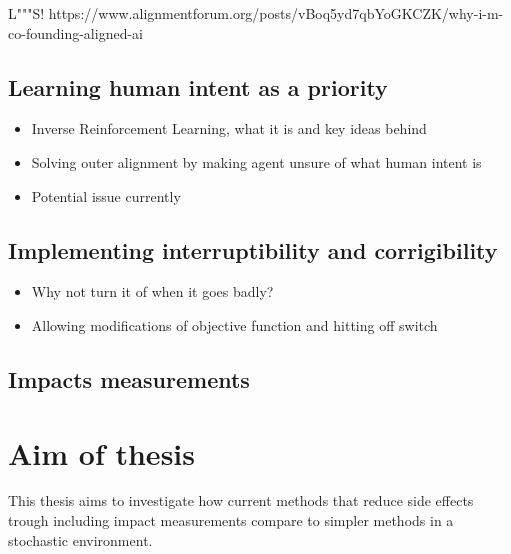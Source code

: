 \documentclass[12pt,A4]{report}
\theoremstyle{definition}
\begin{document}
L"""S!
https://www.alignmentforum.org/posts/vBoq5yd7qbYoGKCZK/why-i-m-co-founding-aligned-ai
\subsection{Learning human intent as a priority}
\begin{itemize}
    \item Inverse Reinforcement Learning, what it is and key ideas behind
    \item Solving outer alignment by making agent unsure of what human intent is
    \item Potential issue currently

\end{itemize}

\subsection{Implementing interruptibility and corrigibility}
\begin{itemize}
    \item Why not turn it of when it goes badly?
    \item Allowing modifications of objective function and hitting off switch
\end{itemize}

\subsection{Impacts measurements}


\section{Aim of thesis}
This thesis aims to investigate how current methods that reduce side effects trough including impact measurements compare to simpler methods in a stochastic environment.
\end{document}
